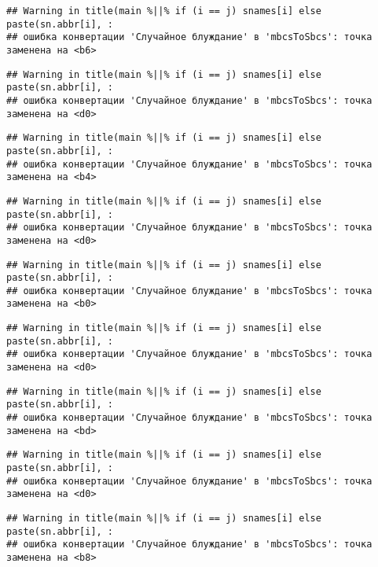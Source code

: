 \documentclass[
]{article}
\begin{document}
\begin{verbatim}
## Warning in title(main %||% if (i == j) snames[i] else paste(sn.abbr[i], :
## ошибка конвертации 'Случайное блуждание' в 'mbcsToSbcs': точка заменена на <b6>
\end{verbatim}

\begin{verbatim}
## Warning in title(main %||% if (i == j) snames[i] else paste(sn.abbr[i], :
## ошибка конвертации 'Случайное блуждание' в 'mbcsToSbcs': точка заменена на <d0>
\end{verbatim}

\begin{verbatim}
## Warning in title(main %||% if (i == j) snames[i] else paste(sn.abbr[i], :
## ошибка конвертации 'Случайное блуждание' в 'mbcsToSbcs': точка заменена на <b4>
\end{verbatim}

\begin{verbatim}
## Warning in title(main %||% if (i == j) snames[i] else paste(sn.abbr[i], :
## ошибка конвертации 'Случайное блуждание' в 'mbcsToSbcs': точка заменена на <d0>
\end{verbatim}

\begin{verbatim}
## Warning in title(main %||% if (i == j) snames[i] else paste(sn.abbr[i], :
## ошибка конвертации 'Случайное блуждание' в 'mbcsToSbcs': точка заменена на <b0>
\end{verbatim}

\begin{verbatim}
## Warning in title(main %||% if (i == j) snames[i] else paste(sn.abbr[i], :
## ошибка конвертации 'Случайное блуждание' в 'mbcsToSbcs': точка заменена на <d0>
\end{verbatim}

\begin{verbatim}
## Warning in title(main %||% if (i == j) snames[i] else paste(sn.abbr[i], :
## ошибка конвертации 'Случайное блуждание' в 'mbcsToSbcs': точка заменена на <bd>
\end{verbatim}

\begin{verbatim}
## Warning in title(main %||% if (i == j) snames[i] else paste(sn.abbr[i], :
## ошибка конвертации 'Случайное блуждание' в 'mbcsToSbcs': точка заменена на <d0>
\end{verbatim}

\begin{verbatim}
## Warning in title(main %||% if (i == j) snames[i] else paste(sn.abbr[i], :
## ошибка конвертации 'Случайное блуждание' в 'mbcsToSbcs': точка заменена на <b8>
\end{verbatim}
\end{document}
